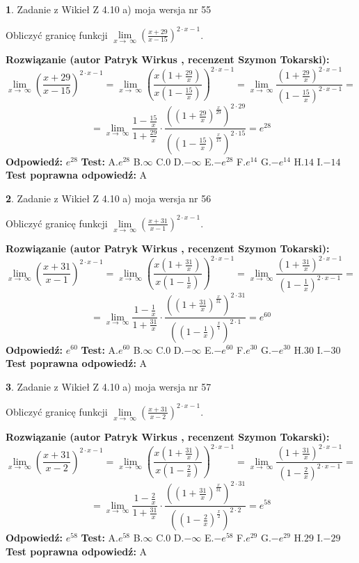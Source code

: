 \documentclass[12pt, a4paper]{article}
\theoremstyle{definition} %
\newtheorem{zad}{}
\newcommand{\zadStart}[1]{\begin{zad}#1\newline}
\newcommand{\zadStop}{\end{zad}}
\newcommand{\rozwStart}[2]{\noindent \textbf{Rozwiązanie (autor #1 , recenzent #2): }\newline}
\newcommand{\rozwStop}{\newline}
\newcommand{\odpStart}{\noindent \textbf{Odpowiedź:}\newline}
\newcommand{\odpStop}{\newline}
\newcommand{\testStart}{\noindent \textbf{Test:}\newline}
\newcommand{\testStop}{\newline}
\newcommand{\kluczStart}{\noindent \textbf{Test poprawna odpowiedź:}\newline}
\newcommand{\kluczStop}{\newline}
\begin{document}
\zadStart{Zadanie z Wikieł Z 4.10 a) moja wersja nr 55}

Obliczyć granicę funkcji  $\lim\limits_{x\to\ \infty}(\frac{x+29}{x-15})^{2\cdot x-1}$.
\zadStop
\rozwStart{Patryk Wirkus}{Szymon Tokarski}
$$\lim\limits_{x\to\ \infty}(\frac{x+29}{x-15})^{2\cdot x-1} = \lim\limits_{x\to\ \infty}(\frac{x(1+\frac{29}{x})}{x(1-\frac{15}{x})})^{2\cdot x-1}=\lim\limits_{x\to\ \infty}\frac{(1+\frac{29}{x})^{2\cdot x-1}}{(1-\frac{15}{x})^{2\cdot x-1}}=$$
$$=\lim\limits_{x\to\ \infty}\frac{1-\frac{15}{x}}{1+\frac{29}{x}}\cdot\frac{((1+\frac{29}{x})^{\frac{x}{29}})^{2\cdot29}}{((1-\frac{15}{x})^{\frac{x}{15}})^{2\cdot15}}=e^{28}$$
\rozwStop
\odpStart
$e^{28}$
\odpStop
\testStart
A.$e^{28}$ B.$\infty$ C.$0$ D.$-\infty$ E.$-e^{28}$
F.$e^{14}$ G.$-e^{14}$
H.$14$
I.$-14$
\testStop
\kluczStart
A
\kluczStop



\zadStart{Zadanie z Wikieł Z 4.10 a) moja wersja nr 56}

Obliczyć granicę funkcji  $\lim\limits_{x\to\ \infty}(\frac{x+31}{x-1})^{2\cdot x-1}$.
\zadStop
\rozwStart{Patryk Wirkus}{Szymon Tokarski}
$$\lim\limits_{x\to\ \infty}(\frac{x+31}{x-1})^{2\cdot x-1} = \lim\limits_{x\to\ \infty}(\frac{x(1+\frac{31}{x})}{x(1-\frac{1}{x})})^{2\cdot x-1}=\lim\limits_{x\to\ \infty}\frac{(1+\frac{31}{x})^{2\cdot x-1}}{(1-\frac{1}{x})^{2\cdot x-1}}=$$
$$=\lim\limits_{x\to\ \infty}\frac{1-\frac{1}{x}}{1+\frac{31}{x}}\cdot\frac{((1+\frac{31}{x})^{\frac{x}{31}})^{2\cdot31}}{((1-\frac{1}{x})^{\frac{x}{1}})^{2\cdot1}}=e^{60}$$
\rozwStop
\odpStart
$e^{60}$
\odpStop
\testStart
A.$e^{60}$ B.$\infty$ C.$0$ D.$-\infty$ E.$-e^{60}$
F.$e^{30}$ G.$-e^{30}$
H.$30$
I.$-30$
\testStop
\kluczStart
A
\kluczStop



\zadStart{Zadanie z Wikieł Z 4.10 a) moja wersja nr 57}

Obliczyć granicę funkcji  $\lim\limits_{x\to\ \infty}(\frac{x+31}{x-2})^{2\cdot x-1}$.
\zadStop
\rozwStart{Patryk Wirkus}{Szymon Tokarski}
$$\lim\limits_{x\to\ \infty}(\frac{x+31}{x-2})^{2\cdot x-1} = \lim\limits_{x\to\ \infty}(\frac{x(1+\frac{31}{x})}{x(1-\frac{2}{x})})^{2\cdot x-1}=\lim\limits_{x\to\ \infty}\frac{(1+\frac{31}{x})^{2\cdot x-1}}{(1-\frac{2}{x})^{2\cdot x-1}}=$$
$$=\lim\limits_{x\to\ \infty}\frac{1-\frac{2}{x}}{1+\frac{31}{x}}\cdot\frac{((1+\frac{31}{x})^{\frac{x}{31}})^{2\cdot31}}{((1-\frac{2}{x})^{\frac{x}{2}})^{2\cdot2}}=e^{58}$$
\rozwStop
\odpStart
$e^{58}$
\odpStop
\testStart
A.$e^{58}$ B.$\infty$ C.$0$ D.$-\infty$ E.$-e^{58}$
F.$e^{29}$ G.$-e^{29}$
H.$29$
I.$-29$
\testStop
\kluczStart
A
\kluczStop
\end{document}

